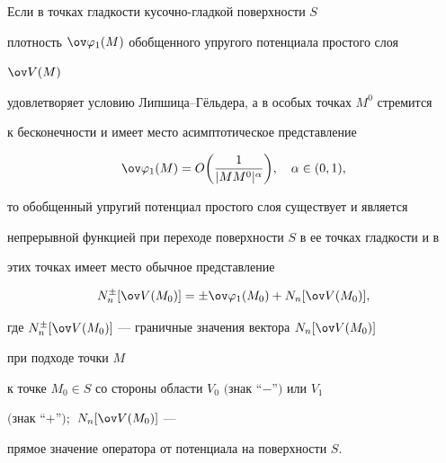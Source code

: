 \begin{lem} 


Если в точках гладкости кусочно-гладкой поверхности $S$ 


плотность $\ov\varphi_1(M)$ обобщенного упругого потенциала простого слоя  


$\ov V(M)$


удовлетворяет условию Липшица--Г\"ельдера, а в особых точках $M^0$ стремится 


к бесконечности и имеет место асимптотическое представление  


\begin{equation} 


\ov\varphi_1(M)=O\bigg(\frac{1}{|MM^0|^\alpha} \bigg),\quad 


\alpha\in(0,1), 


\end{equation} 


то обобщенный упругий потенциал простого слоя существует и является  


непрерывной функцией при переходе поверхности $S$ в ее точках гладкости и в  


этих точках имеет место обычное представление  


\begin{equation} 


N^\pm_n[\ov V(M_0)]=\pm\ov\varphi_1(M_0)+N_n[\ov V(M_0)], 


\end{equation} 


где $N^\pm_n[\ov V(M_0)]$ --- граничные значения вектора $N_n[\ov V(M_0)]$


при подходе точки $M$ 


к точке $M_0\in S$ со стороны области $V_0$ $($знак ``$-$''$)$ или $V_1$ 


$($знак ``$+$''$);$ $N_n[\ov V(M_0)]$ --- 


прямое значение оператора от потенциала на поверхности $S$. 


\end{lem} 


 


